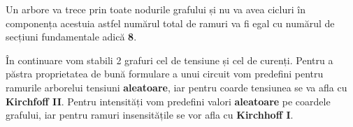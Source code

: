 \documentclass[12pt, a4paper]{article}
\begin{document}
\newpage

Un arbore va trece prin toate nodurile grafului și nu va avea cicluri în componența acestuia astfel numărul total de ramuri va fi egal cu numărul de secțiuni fundamentale adică \textbf{8}.

În continuare vom stabili 2 grafuri cel de tensiune și cel de curenți. Pentru a păstra proprietatea de bună formulare a unui circuit vom predefini pentru ramurile arborelui tensiuni \textbf{aleatoare}, iar pentru coarde tensiunea se va afla cu \textbf{Kirchfoff II}. Pentru intensități vom predefini valori \textbf{aleatoare} pe coardele grafului, iar pentru ramuri insensitățile se vor afla cu \textbf{Kirchhoff I}.

\begin{center}



\begin{tikzpicture}[x=0.75pt,y=0.75pt,yscale=-1,xscale=1]


\end{tikzpicture}
\end{center}
\end{document}
